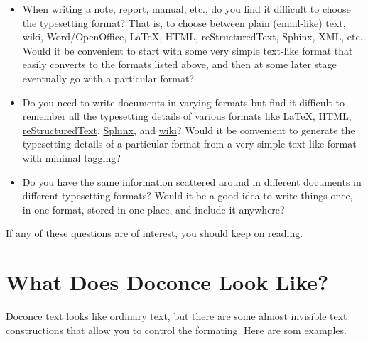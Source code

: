 \documentclass[%
oneside,                 %
final,                   %
10pt]{article}
\begin{document}
\begin{itemize}
 \item When writing a note, report, manual, etc., do you find it difficult
   to choose the typesetting format? That is, to choose between plain
   (email-like) text, wiki, Word/OpenOffice, {\LaTeX}, HTML,
   reStructuredText, Sphinx, XML, etc.  Would it be convenient to
   start with some very simple text-like format that easily converts
   to the formats listed above, and then at some later stage
   eventually go with a particular format?

 \item Do you need to write documents in varying formats but find it
   difficult to remember all the typesetting details of various
   formats like \href{{http://refcards.com/docs/silvermanj/amslatex/LaTeXRefCard.v2.0.pdf}}{LaTeX}, \href{{http://www.htmlcodetutorial.com/}}{HTML}, \href{{http://docutils.sourceforge.net/docs/ref/rst/restructuredtext.html}}{reStructuredText}, \href{{http://sphinx.pocoo.org/contents.html}}{Sphinx}, and \href{{http://code.google.com/p/support/wiki/WikiSyntax}}{wiki}? Would it be convenient
   to generate the typesetting details of a particular format from a
   very simple text-like format with minimal tagging?

 \item Do you have the same information scattered around in different
   documents in different typesetting formats? Would it be a good idea
   to write things once, in one format, stored in one place, and
   include it anywhere?
\end{itemize}

\noindent
If any of these questions are of interest, you should keep on reading.


\section{What Does Doconce Look Like?}

Doconce text looks like ordinary text, but there are some almost invisible
text constructions that allow you to control the formating. Here are
som examples.
\end{document}
